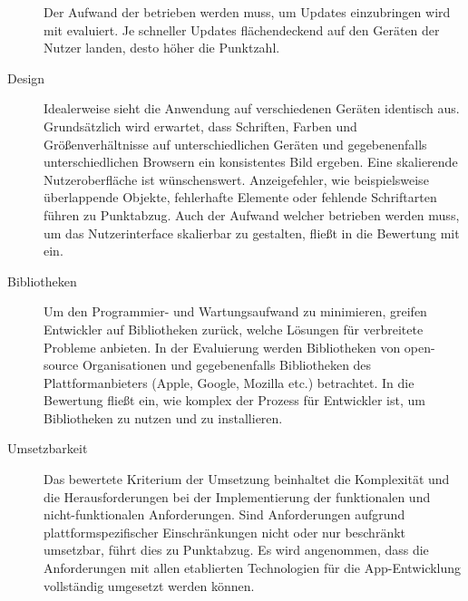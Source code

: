 \begin{description}
	      Der Aufwand der betrieben werden muss, um Updates einzubringen wird mit evaluiert. Je schneller Updates flächendeckend auf den Geräten der Nutzer landen, desto höher die Punktzahl.

	\item [Design]
	      Idealerweise sieht die Anwendung auf verschiedenen Geräten identisch aus. Grundsätzlich wird erwartet, dass Schriften, Farben und Größenverhältnisse auf unterschiedlichen Geräten und gegebenenfalls unterschiedlichen Browsern ein konsistentes Bild ergeben.
	      Eine skalierende Nutzeroberfläche ist wünschenswert. Anzeigefehler, wie beispielsweise überlappende Objekte, fehlerhafte Elemente oder fehlende Schriftarten führen zu Punktabzug. Auch der Aufwand welcher betrieben werden muss, um das Nutzerinterface skalierbar zu gestalten, fließt in die Bewertung mit ein.

	      

	\item[Bibliotheken]
		Um den Programmier- und Wartungsaufwand zu minimieren, greifen Entwickler auf Bibliotheken zurück, welche Lösungen für verbreitete Probleme anbieten.
		 In der Evaluierung werden Bibliotheken von open-source Organisationen und gegebenenfalls Bibliotheken des Plattformanbieters (Apple, Google, Mozilla etc.) betrachtet. In die Bewertung fließt ein, wie komplex der Prozess für Entwickler ist, um Bibliotheken zu nutzen und zu installieren. 

	\item[Umsetzbarkeit]
		Das bewertete Kriterium der Umsetzung beinhaltet die Komplexität und die Herausforderungen bei der Implementierung der funktionalen und nicht-funktionalen Anforderungen. Sind Anforderungen aufgrund plattformspezifischer Einschränkungen nicht oder nur beschränkt umsetzbar, führt dies zu Punktabzug. Es wird angenommen, dass die Anforderungen mit allen etablierten Technologien für die App-Entwicklung vollständig umgesetzt werden können.
		

\end{description}
